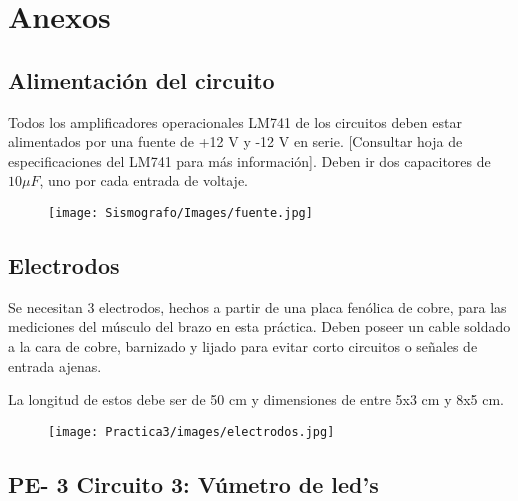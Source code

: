 \documentclass[12pt]{article}
\begin{document}
	    

		\newpage
	
	\section{Anexos}
	    \subsection{Alimentación del circuito}
	        Todos los amplificadores operacionales LM741 de los circuitos deben estar alimentados por una fuente de +12 V y -12 V en serie. [Consultar hoja de especificaciones del LM741 para más información]. Deben ir dos capacitores de $10\mu F$, uno por cada entrada de voltaje.
	        
	        \begin{figure}[h!]
                \centering
                \texttt{[image: Sismografo/Images/fuente.jpg]}
            \end{figure} 
 
            \subsection{Electrodos}
            Se necesitan 3 electrodos, hechos a partir de una placa fenólica de cobre, para las mediciones del músculo del brazo en esta práctica. Deben poseer un cable soldado a la cara de cobre, barnizado y lijado para evitar corto circuitos o señales de entrada ajenas.
            
            La longitud de estos debe ser de 50 cm y dimensiones de entre 5x3 cm y 8x5 cm.
            \newpage
            \begin{figure}[h!]
                \centering
                \texttt{[image: Practica3/images/electrodos.jpg]}
            \end{figure}
            
		\subsection{PE- 3 Circuito 3: Vúmetro de led's}
		
\end{document}
